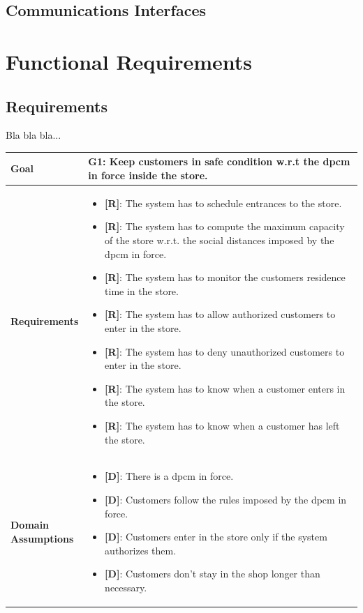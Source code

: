 \subsection{Communications Interfaces}

\section{Functional Requirements}

\subsection{Requirements}

Bla bla bla...

\begin{table}[H]
\centering
\begin{tabular}{| m{} | m{} |} 
	\hline
	\textbf{Goal} &
		\textbf{G1: Keep customers in safe condition w.r.t the \gls{dpcm} in force inside the store.} \\
	\hline
	\textbf{Requirements} &
		\begin{itemize}
			\item {\textbf{[R]}}: The system has to schedule entrances to the store.
			\item {\textbf{[R]}}: The system has to compute the maximum capacity of the store w.r.t. the social distances imposed by the \gls{dpcm} in force.
			\item {\textbf{[R]}}: The system has to monitor the customers residence time in the store.
			\item {\textbf{[R]}}: The system has to allow authorized customers to enter in the store.
			\item {\textbf{[R]}}: The system has to deny unauthorized customers to enter in the store.
			\item {\textbf{[R]}}: The system has to know when a customer enters in the store.
			\item {\textbf{[R]}}: The system has to know when a customer has left the store.
		\end{itemize} \\
	\hline
	\shortstack[l]{\textbf{Domain} \\ \textbf{Assumptions}} & 
		\begin{itemize}
			\item {\textbf{[D]}}: There is a \gls{dpcm} in force.
			\item {\textbf{[D]}}: Customers follow the rules imposed by the \gls{dpcm} in force.
			\item {\textbf{[D]}}: Customers enter in the store only if the system authorizes them.
			\item {\textbf{[D]}}: Customers don't stay in the shop longer than necessary.
		\end{itemize} \\ 
	\hline
\end{tabular}
\end{table}

